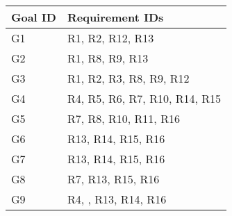 \documentclass[../../main.tex]{subfiles}
\begin{document}
    {
    \begin{table}[H]
      \centering
      \begin{tabular}{|l|l|}
        \hline
        \textbf{Goal ID} & \textbf{Requirement IDs}\\ \hline\hline
        G1 & R1, R2, R12, R13 \\
        G2 & R1, R8, R9, R13 \\
        G3 & R1, R2, R3, R8, R9, R12\\
        G4 & R4, R5, R6, R7, R10, R14, R15\\
        G5 & R7, R8, R10, R11, R16\\
        G6 & R13, R14, R15, R16\\
        G7 & R13, R14, R15, R16\\
        G8 & R7, R13, R15, R16\\
        G9 & R4, , R13, R14, R16\\
        \hline
      \end{tabular}
      \end{table}
    }
\end{document}
